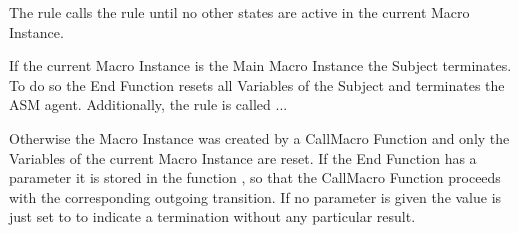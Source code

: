 The  rule calls the  rule
until no other states are active in the current Macro Instance.

If the current Macro Instance is the Main Macro Instance the Subject terminates.
To do so the End Function resets all Variables of the Subject and terminates the
ASM agent.
Additionally, the  rule is called ... %

Otherwise the Macro Instance was created by a CallMacro Function and only the
Variables of the current Macro Instance are reset. If the End Function has a
parameter it is stored in the function , so
that the CallMacro Function proceeds with the corresponding outgoing transition.
If no parameter is given the value is just set to  to indicate a
termination without any particular result.


